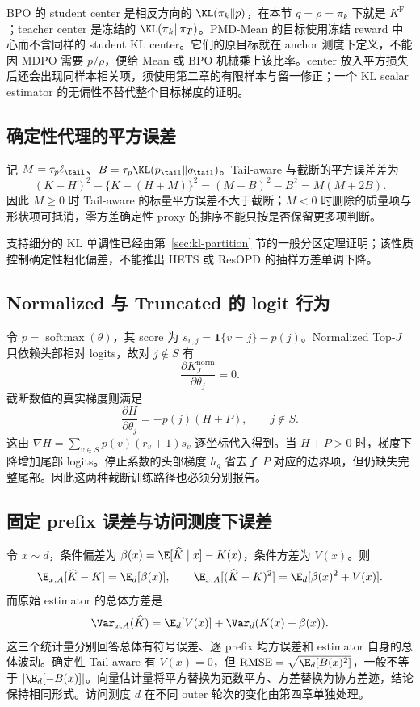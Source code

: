 BPO 的 student center 是相反方向的 $\KL(\pi_k\Vert p)$，在本节 $q=\rho=\pi_k$ 下就是 $K^{\mathrm F}$；teacher center 是冻结的 $\KL(\pi_k\Vert\pi_T)$。PMD-Mean 的目标使用冻结 reward 中心而不含同样的 student KL center。它们的原目标就在 anchor 测度下定义，不能因 MDPO 需要 $p/\rho$，便给 Mean 或 BPO 机械乘上该比率。center 放入平方损失后还会出现同样本相关项，须使用第二章的有限样本与留一修正；一个 KL scalar estimator 的无偏性不替代整个目标梯度的证明。

\subsection{确定性代理的平方误差}

记 $M=\tau_p\ell_{\tail}$、$B=\tau_p\KL(p_{\tail}\Vert q_{\tail})$。Tail-aware 与截断的平方误差差为
\[
 (K-H)^2-\{K-(H+M)\}^2=(M+B)^2-B^2=M(M+2B).
\]
因此 $M\geq0$ 时 Tail-aware 的标量平方误差不大于截断；$M<0$ 时删除的质量项与形状项可抵消，零方差确定性 proxy 的排序不能只按是否保留更多项判断。

支持细分的 KL 单调性已经由第~\ref{sec:kl-partition} 节的一般分区定理证明；该性质控制确定性粗化偏差，不能推出 HETS 或 ResOPD 的抽样方差单调下降。

\subsection{Normalized 与 Truncated 的 logit 行为}

令 $p=\operatorname{softmax}(\theta)$，其 score 为 $s_{v,j}=\mathbf1\{v=j\}-p(j)$。Normalized Top-$J$ 只依赖头部相对 logits，故对 $j\notin S$ 有
\[
 \frac{\partial K^{\mathrm{norm}}_J}{\partial\theta_j}=0.
\]
截断数值的真实梯度则满足
\[
 \frac{\partial H}{\partial\theta_j}=-p(j)(H+P),\qquad j\notin S.
\]
这由 $\nabla H=\sum_{v\in S}p(v)(r_v+1)s_v$ 逐坐标代入得到。当 $H+P>0$ 时，梯度下降增加尾部 logits。停止系数的头部梯度 $h_g$ 省去了 $P$ 对应的边界项，但仍缺失完整尾部。因此这两种截断训练路径也必须分别报告。

\subsection{固定 prefix 误差与访问测度下误差}

令 $x\sim d$，条件偏差为 $\beta(x)=\E[\widehat K\mid x]-K(x)$，条件方差为 $V(x)$。则
\[
 \E_{x,A}[\widehat K-K]=\E_d[\beta(x)],\qquad
 \E_{x,A}[(\widehat K-K)^2]=\E_d[\beta(x)^2+V(x)].
\]
而原始 estimator 的总体方差是
\[
 \Var_{x,A}(\widehat K)
 =\E_d[V(x)]+\Var_d(K(x)+\beta(x)).
\]
这三个统计量分别回答总体有符号误差、逐 prefix 均方误差和 estimator 自身的总体波动。确定性 Tail-aware 有 $V(x)=0$，但 $\operatorname{RMSE}=\sqrt{\E_d[B(x)^2]}$，一般不等于 $|\E_d[-B(x)]|$。向量估计量将平方替换为范数平方、方差替换为协方差迹，结论保持相同形式。访问测度 $d$ 在不同 outer 轮次的变化由第四章单独处理。

